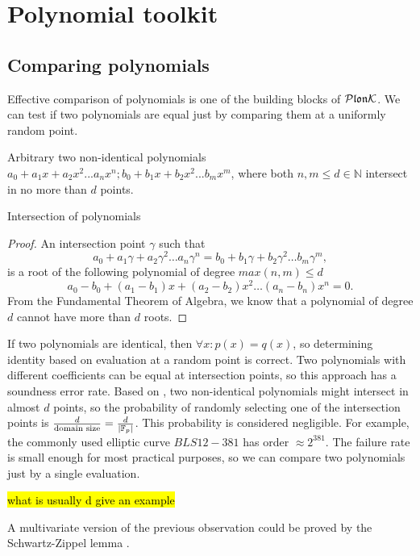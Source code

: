 \section{Polynomial toolkit}

\subsection{Comparing polynomials}
\label{comparing-poly}

Effective comparison of polynomials is one of the building blocks of $\mathcal{P}\mathfrak{lon}\mathcal{K}$. We can test if two polynomials are equal just by comparing them at a uniformly random point. 
\begin{theorem}
\label{theorem:poly-intersection}
    Arbitrary two non-identical polynomials $a_0 + a_1x + a_2x^2 ... a_nx^n; b_0 + b_1x + b_2x^2 ... b_m x^m$, where both $n, m \leq d \in \mathbb{N}$ intersect in no more than $d$ points.
\end{theorem}{Intersection of polynomials}

\begin{proof}
    An intersection point $\gamma$ such that $$a_0 + a_1 \gamma + a_2 \gamma^2 \ldots a_n \gamma^n = b_0 + b_1 \gamma + b_2 \gamma^2 \ldots b_m \gamma^m,$$ 
    is a root of the following polynomial of degree $max(n,m) \leq d$
    $$a_0-b_0 + (a_1-b_1)x + (a_2-b_2)x^2 \ldots (a_n - b_n)x^n = 0.$$
    From the Fundamental Theorem of Algebra, we know that a polynomial of degree $d$ cannot have more than $d$ roots.
\end{proof}

If two polynomials are identical, then $\forall x: p(x) = q(x)$, so determining identity based on evaluation at a random point is correct. Two polynomials with different coefficients can be equal at intersection points, so this approach has a soundness error rate. Based on , two non-identical polynomials might intersect in almost $d$ points, so the probability of randomly selecting one of the intersection points is $\frac{d}{\text{domain size}} = \frac{d}{|\mathbb{F}_p|}$. This probability is considered negligible. For example, the commonly used elliptic curve $BLS12-381$ has order $\approx 2^{381}$. The failure rate is small enough for most practical purposes, so we can compare two polynomials just by a single evaluation.

\hl{what is usually d give an example}

A multivariate version of the previous observation could be proved by the Schwartz-Zippel lemma \cite{schwartz-lemma}.

